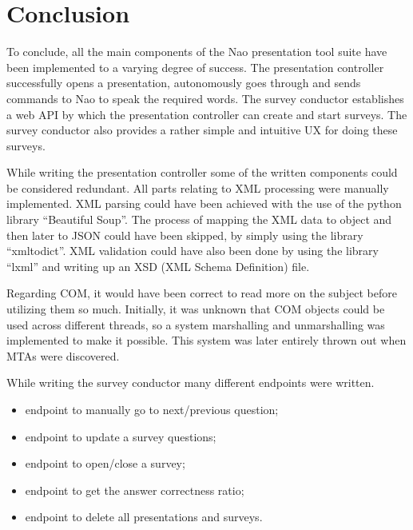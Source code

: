 \documentclass[12pt, fleqn, a4paper]{article}
\begin{document}
\section*{\centering Conclusion}
To conclude, all the main components of the Nao presentation tool suite have been implemented to a varying degree of success. The presentation controller successfully opens a presentation, autonomously goes through and sends commands to Nao to speak the required words.
The survey conductor establishes a web API by which the presentation controller can create and start surveys. The survey conductor also provides a rather simple and intuitive UX for doing these surveys.
\par
While writing the presentation controller some of the written components could be considered redundant. All parts relating to XML processing were manually implemented. XML parsing could have been achieved with the use of the python library \enquote{Beautiful Soup}.
The process of mapping the XML data to object and then later to JSON could have been skipped, by simply using the library \enquote{xmltodict}. XML validation could have also been done by using the library \enquote{lxml} and writing up an XSD (XML Schema Definition) file.\par
Regarding COM, it would have been correct to read more on the subject before utilizing them so much. Initially, it was unknown that COM objects could be used across different threads, so a system marshalling and unmarshalling was implemented to make it possible. This system was later entirely thrown out when MTAs were discovered.\par
While writing the survey conductor many different endpoints were written.
\begin{itemize}
	\item endpoint to manually go to next/previous question;
	\item endpoint to update a survey questions;
	\item endpoint to open/close a survey;
	\item endpoint to get the answer correctness ratio;
	\item endpoint to delete all presentations and surveys.
\end{itemize}
\end{document}
